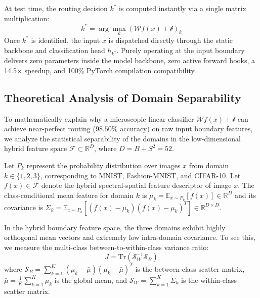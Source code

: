 \documentclass{article}
\theoremstyle{plain}
\theoremstyle{definition}
\theoremstyle{remark}
\begin{document}
At test time, the routing decision $k^*$ is computed instantly via a single matrix multiplication:
\begin{equation}
    k^* = \arg\max_k \left( \mathcal{W} f(x) + \mathcal{b} \right)_k
\end{equation}
Once $k^*$ is identified, the input $x$ is dispatched directly through the static backbone and classification head $h_{k^*}$. Purely operating at the input boundary delivers zero parameters inside the model backbone, zero active forward hooks, a 14.5$\times$ speedup, and 100\% PyTorch compilation compatibility.

\subsection{Theoretical Analysis of Domain Separability}
To mathematically explain why a microscopic linear classifier $\mathcal{W} f(x) + \mathcal{b}$ can achieve near-perfect routing ($98.50\%$ accuracy) on raw input boundary features, we analyze the statistical separability of the domains in the low-dimensional hybrid feature space $\mathcal{F} \subset \mathbb{R}^D$, where $D = B + S^2 = 52$.

Let $P_k$ represent the probability distribution over images $x$ from domain $k \in \{1, 2, 3\}$, corresponding to MNIST, Fashion-MNIST, and CIFAR-10. Let $f(x) \in \mathcal{F}$ denote the hybrid spectral-spatial feature descriptor of image $x$. The class-conditional mean feature for domain $k$ is $\mu_k = \mathbb{E}_{x \sim P_k} [f(x)] \in \mathbb{R}^D$ and its covariance is $\Sigma_k = \mathbb{E}_{x \sim P_k} [(f(x) - \mu_k)(f(x) - \mu_k)^T] \in \mathbb{R}^{D \times D}$.

In the hybrid boundary feature space, the three domains exhibit highly orthogonal mean vectors and extremely low intra-domain covariance. To see this, we measure the multi-class between-to-within-class variance ratio:
\begin{equation}
    J = \text{Tr} \left( \mathcal{S}_W^{-1} \mathcal{S}_B \right)
\end{equation}
where $\mathcal{S}_B = \sum_{k=1}^K (\mu_k - \bar{\mu})(\mu_k - \bar{\mu})^T$ is the between-class scatter matrix, $\bar{\mu} = \frac{1}{K}\sum_{k=1}^K \mu_k$ is the global mean, and $\mathcal{S}_W = \sum_{k=1}^K \Sigma_k$ is the within-class scatter matrix.
\end{document}
